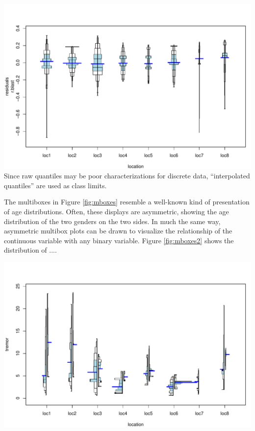\documentclass[11pt]{article}
\begin{document}
\Bfig
\includegraphics{regr-description-mboxes}
Since raw quantiles may be poor characterizations for discrete data,
``interpolated quantiles'' are used as class limits.

The multiboxes in Figure \ref{fig:mboxes} resemble a well-known kind of
presentation of age distributions. Often, these displays are asymmetric,
showing the age distribution of the two genders on the two sides.
In much the same way, asymmetric multibox plots can be drawn to visualize
the relationship of the continuous variable with any binary variable.
Figure \ref{fig:mboxes2} shows the distribution of ....

\Bfig
\includegraphics{regr-description-mboxes2}
\end{document}
